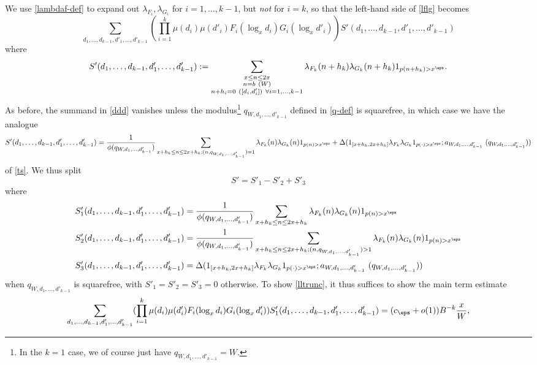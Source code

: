 We use \eqref{lambdaf-def} to expand out $\lambda_{F_{i}}, \lambda_{G_{i}}$ for $i=1,\dots,k-1$, but \emph{not} for $i=k$, so that the left-hand side of \eqref{lflg} becomes
\begin{equation}\label{ddd}
 \sum_{d_1,\dots,d_{k-1},d'_1,\dots,d'_{k-1}} (\prod_{i=1}^k \mu(d_{i}) \mu(d'_{i}) F_{i}(\log_x d_{i}) G_{i}(\log_x d'_{i})) S'(d_1,\dots,d_{k-1},d'_1,\dots,d'_{k-1})
\end{equation}
where
$$ S'(d_1,\dots,d_{k-1},d'_1,\dots,d'_{k-1}) := 
 \sum_{\substack{x \leq n \leq 2x\\ n = b\ (W) \\ n + h_{i} = 0\ ([d_{i},d'_{i}])\ \forall i=1,\dots,k-1}} \lambda_{F_k}(n+h_k) \lambda_{G_k}(n+h_k) 1_{p(n+h_k) 
> x^\eps}.
$$
As before, the summand in \eqref{ddd} vanishes unless the modulus\footnote{In the $k=1$ case, we of course just have $q_{W,d_1,\dots,d'_{k-1}} = W$.}
$q_{W,d_1,\dots,d'_{k-1}}$ defined in \eqref{q-def} is squarefree, in which case we have the analogue
\begin{equation}\label{tsp}
 S'(d_1,\dots,d_{k-1},d'_1,\dots,d'_{k-1}) = \frac{1}{\phi(q_{W,d_1,\dots,d'_{k-1}})} \sum_{x+h_k \leq n \leq 2x+h_k; (n,q_{W,d_1,\dots,d'_{k-1}})=1} \lambda_{F_k}(n) \lambda_{G_k}(n) 1_{p(n)>x^\eps}
+ \Delta( 1_{[x+h_k,2x+h_k]} \lambda_{F_k} \lambda_{G_k} 1_{p(\cdot) > x^\eps};  a_{W,d_1,\dots,d'_{k-1}}\ (q_{W,d_1,\dots,d'_{k-1}}))
\end{equation}
of \eqref{ts}.  We thus split
$$ S' = S'_1 - S'_2 + S'_3$$
where
\begin{align}
 S'_1(d_1,\dots,d_{k-1},d'_1,\dots,d'_{k-1}) &= \frac{1}{\phi(q_{W,d_1,\dots,d'_{k-1}})} \sum_{x+h_k \leq n \leq 2x+h_k} \lambda_{F_k}(n) \lambda_{G_k}(n) 1_{p(n)>x^\eps} \label{sp1-def}\\
 S'_2(d_1,\dots,d_{k-1},d'_1,\dots,d'_{k-1}) &= \frac{1}{\phi(q_{W,d_1,\dots,d'_{k-1}})} \sum_{x+h_k \leq n \leq 2x+h_k; (n,q_{W,d_1,\dots,d'_{k-1}}) > 1} \lambda_{F_k}(n) \lambda_{G_k}(n) 1_{p(n)>x^\eps} \label{sp2-def}\\
 S'_3(d_1,\dots,d_{k-1},d'_1,\dots,d'_{k-1}) &= \Delta( 1_{[x+h_k,2x+h_k]} \lambda_{F_k} \lambda_{G_k} 1_{p(\cdot) > x^\eps};  a_{W,d_1,\dots,d'_{k-1}}\ (q_{W,d_1,\dots,d'_{k-1}}))\label{sp3-def}
\end{align}
when $q_{W,d_1,\dots,d'_{k-1}}$ is squarefree, with $S'_1=S'_2=S'_3=0$ otherwise. To show \eqref{lltrunc}, it thus suffices to show the main term estimate
\begin{equation}\label{ll-main}
 \sum_{d_1,\dots,d_{k-1},d'_1,\dots,d'_{k-1}} (\prod_{i=1}^k \mu(d_{i}) \mu(d'_{i}) F_{i}(\log_x d_{i}) G_{i}(\log_x d'_{i})) S'_1(d_1,\dots,d_{k-1},d'_1,\dots,d'_{k-1}) = (c_\eps + o(1)) B^{-k} \frac{x}{W},
\end{equation}
